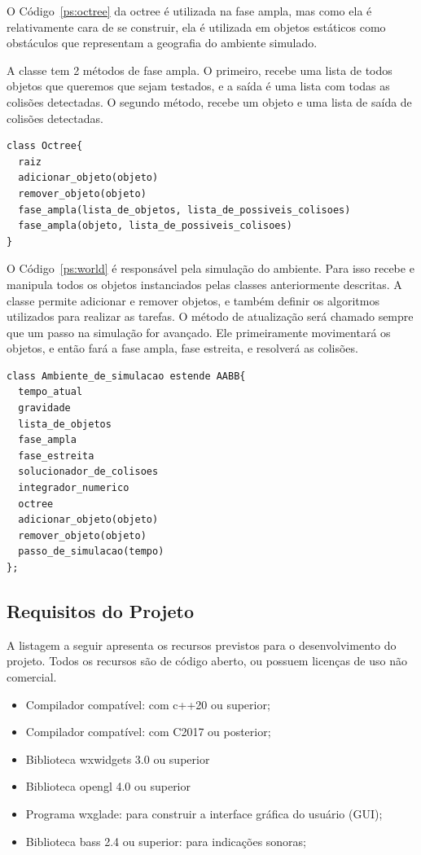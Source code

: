 O Código~\ref{ps:octree} da octree é utilizada na fase ampla, mas como ela é relativamente cara de se construir, ela é utilizada em objetos estáticos como obstáculos que representam a geografia do ambiente simulado. 

A classe tem 2 métodos de fase ampla. O primeiro, recebe uma lista de todos objetos que queremos que sejam testados, e a saída é uma lista com todas as colisões detectadas. O segundo método, recebe um objeto e uma lista de saída de colisões detectadas.

\begin{lstlisting}[frame=single,caption=Modelagem prévia para octree\label{ps:octree}]
class Octree{
  raiz
  adicionar_objeto(objeto)
  remover_objeto(objeto)
  fase_ampla(lista_de_objetos, lista_de_possiveis_colisoes)
  fase_ampla(objeto, lista_de_possiveis_colisoes)
}
\end{lstlisting}

O Código~\ref{ps:world} é responsável pela simulação do ambiente. Para isso recebe e manipula todos os objetos instanciados pelas classes anteriormente descritas. A classe permite adicionar e remover objetos, e também definir os algoritmos utilizados para realizar as tarefas.
O método de atualização será chamado sempre que um passo na simulação for avançado. Ele primeiramente movimentará os objetos, e então fará a fase ampla, fase
estreita, e resolverá as colisões.

\begin{lstlisting}[frame=single,caption=Modelagem prévia para ambiente de simulação\label{ps:world}]
class Ambiente_de_simulacao estende AABB{
  tempo_atual
  gravidade
  lista_de_objetos
  fase_ampla
  fase_estreita
  solucionador_de_colisoes
  integrador_numerico
  octree
  adicionar_objeto(objeto)
  remover_objeto(objeto)
  passo_de_simulacao(tempo)
};
\end{lstlisting}


\subsection{Requisitos do Projeto}

A listagem a seguir apresenta os recursos previstos para o desenvolvimento do projeto. Todos os  recursos são  de código aberto, ou possuem licenças de uso não comercial.

\begin{itemize}
\item Compilador compatível: com c++20 ou superior;
\item Compilador compatível: com C2017 ou posterior;
\item Biblioteca wxwidgets 3.0 ou superior
\item Biblioteca opengl 4.0 ou superior
\item Programa wxglade: para construir a interface gráfica do usuário (GUI);
\item Biblioteca bass 2.4 ou superior: para indicações sonoras;
\end{itemize}

